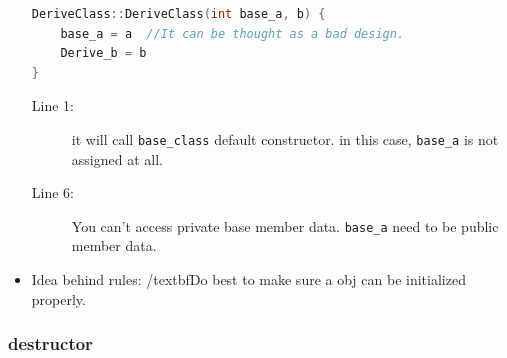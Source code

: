 \documentclass[a4paper,11pt,twoside]{book}
\begin{document}
\begin{itemize}
\begin{lstlisting}[frame=single, language=c++]
DeriveClass::DeriveClass(int base_a, b) {
	base_a = a  //It can be thought as a bad design.
	Derive_b = b
}
\end{lstlisting}
\begin{description}
	\item[Line 1:] it will call \texttt{base\_class} default constructor. in this case, \texttt{base\_a} is not assigned at all.
	\item[Line 6:] You can't  access private base member data. \texttt{base\_a} need to be public member data.
\end{description}

	\item Idea behind rules: /textbf{Do best to make sure a obj can be initialized properly.}
\end{itemize}


\subsubsection{destructor}
\end{document}
